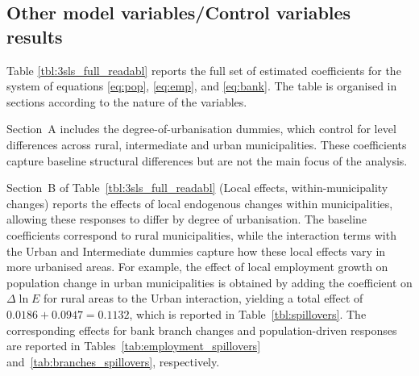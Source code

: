 \documentclass[a4paper,11pt,oneside]{article}
\begin{document}
\subsection{Other model variables/Control variables results}


{


Table \ref{tbl:3sls_full_readabl} reports the full set of estimated coefficients for the system of equations \ref{eq:pop}, \ref{eq:emp}, and \ref{eq:bank}. The table is organised in sections according to the nature of the variables.

Section~A includes the degree-of-urbanisation dummies, which control for level differences across rural, intermediate and urban municipalities. These coefficients capture baseline structural differences but are not the main focus of the analysis.



Section~B of Table~\ref{tbl:3sls_full_readabl} (Local effects, within-municipality changes) reports the effects of local endogenous changes within municipalities, allowing these responses to differ by degree of urbanisation. The baseline coefficients correspond to rural municipalities, while the interaction terms with the Urban and Intermediate dummies capture how these local effects vary in more urbanised areas. For example, the effect of local employment growth on population change in urban municipalities is obtained by adding the coefficient on $\Delta\ln E$ for rural areas to the Urban interaction, yielding a total effect of $0.0186 + 0.0947 = 0.1132$, which is reported in Table~\ref{tbl:spillovers}. The corresponding effects for bank branch changes and population-driven responses are reported in Tables~\ref{tab:employment_spillovers} and~\ref{tab:branches_spillovers}, respectively.





}
\end{document}
